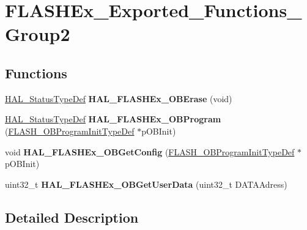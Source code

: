 \hypertarget{group___f_l_a_s_h_ex___exported___functions___group2}{}\section{F\+L\+A\+S\+H\+Ex\+\_\+\+Exported\+\_\+\+Functions\+\_\+\+Group2}
\label{group___f_l_a_s_h_ex___exported___functions___group2}
\subsection*{Functions}
\begin{DoxyCompactItemize}
\item 
\mbox{\label{group___f_l_a_s_h_ex___exported___functions___group2_ga74d4265b88afed50efe9fda0f025979a}} 
\hyperlink{stm32f1xx__hal__def_8h_a63c0679d1cb8b8c684fbb0632743478f}{H\+A\+L\+\_\+\+Status\+Type\+Def} {\bfseries H\+A\+L\+\_\+\+F\+L\+A\+S\+H\+Ex\+\_\+\+O\+B\+Erase} (void)
\item 
\mbox{\label{group___f_l_a_s_h_ex___exported___functions___group2_ga001dd4a8defa9eb24a17c4df5953a41d}} 
\hyperlink{stm32f1xx__hal__def_8h_a63c0679d1cb8b8c684fbb0632743478f}{H\+A\+L\+\_\+\+Status\+Type\+Def} {\bfseries H\+A\+L\+\_\+\+F\+L\+A\+S\+H\+Ex\+\_\+\+O\+B\+Program} (\hyperlink{struct_f_l_a_s_h___o_b_program_init_type_def}{F\+L\+A\+S\+H\+\_\+\+O\+B\+Program\+Init\+Type\+Def} $\ast$p\+O\+B\+Init)
\item 
\mbox{\label{group___f_l_a_s_h_ex___exported___functions___group2_ga6d45d5442b8147533b1100ec40fe75d7}} 
void {\bfseries H\+A\+L\+\_\+\+F\+L\+A\+S\+H\+Ex\+\_\+\+O\+B\+Get\+Config} (\hyperlink{struct_f_l_a_s_h___o_b_program_init_type_def}{F\+L\+A\+S\+H\+\_\+\+O\+B\+Program\+Init\+Type\+Def} $\ast$p\+O\+B\+Init)
\item 
\mbox{\label{group___f_l_a_s_h_ex___exported___functions___group2_ga683593291451ae3e0dd1a6426ba72b3a}} 
uint32\+\_\+t {\bfseries H\+A\+L\+\_\+\+F\+L\+A\+S\+H\+Ex\+\_\+\+O\+B\+Get\+User\+Data} (uint32\+\_\+t D\+A\+T\+A\+Adress)
\end{DoxyCompactItemize}


\subsection{Detailed Description}
